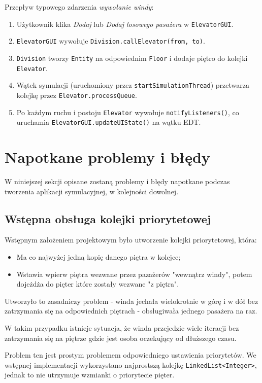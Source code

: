 \documentclass[12pt, a4paper]{article}
\begin{document}
Przepływ typowego zdarzenia \emph{wywołanie windy}:

\begin{enumerate}
  \item Użytkownik klika \emph{Dodaj} lub \emph{Dodaj losowego pasażera} w \texttt{ElevatorGUI}.
  \item \texttt{ElevatorGUI} wywołuje \texttt{Division.callElevator(from, to)}.
  \item \texttt{Division} tworzy \texttt{Entity} na odpowiednim \texttt{Floor} i dodaje piętro do kolejki \texttt{Elevator}.
  \item Wątek symulacji (uruchomiony przez \texttt{startSimulationThread}) przetwarza kolejkę przez \texttt{Elevator.processQueue}.
  \item Po każdym ruchu i postoju \texttt{Elevator} wywołuje \texttt{notifyListeners()}, co uruchamia \texttt{ElevatorGUI.updateUIState()} na wątku EDT.
\end{enumerate}

\section{Napotkane problemy i błędy}

W niniejszej sekcji opisane zostaną problemy i błędy napotkane podczas tworzenia aplikacji symulacyjnej, w kolejności dowolnej.

\subsection{Wstępna obsługa kolejki priorytetowej}

Wstępnym założeniem projektowym było utworzenie kolejki priorytetowej, która:
\begin{itemize}
  \item Ma co najwyżej jedną kopię danego piętra w kolejce;
  \item Wstawia wpierw piętra wezwane przez pazażerów "wewnątrz windy", potem dojeżdża do pięter które zostały wezwane "z piętra". 
\end{itemize}

Utworzyło to zasadniczy problem - winda jechała wielokrotnie w górę i w dół bez zatrzymania się na odpowiednich piętrach - obsługiwała jednego pasażera na raz.

W takim przypadku istnieje sytuacja, że winda przejedzie wiele iteracji bez zatrzymania się na piętrze gdzie jest osoba oczekujący od dłuższego czasu. 

Problem ten jest prostym problemem odpowiedniego ustawienia priorytetów. We wstępnej implementacji wykorzystano najprostszą kolejkę \texttt{LinkedList<Integer>}, jednak to nie 
utrzymuje wzmianki o priorytecie pięter. 
\end{document}
